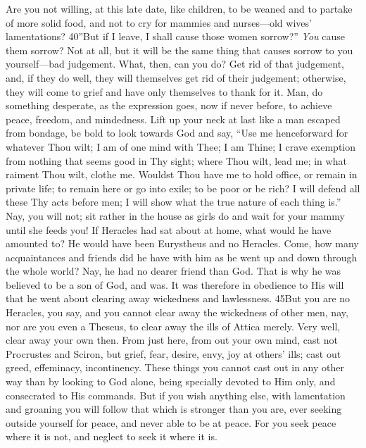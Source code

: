 Are you not willing, at this late date, like children, to be weaned and to partake of more solid food, and not to cry for mammies and nurses—old wives' lamentations? 40''But if I leave, I shall cause those women sorrow?'' \emph{You} cause them sorrow? Not at all, but it will be the same thing that causes sorrow to you yourself—bad judgement. What, then, can you do? Get rid of that judgement, and, if they do well, they will themselves get rid of their judgement; otherwise, they will come to grief and have only themselves to thank for it. Man, do something desperate, as the expression goes, now if never before, to achieve peace, freedom, and mindedness. Lift up your neck at last like a man escaped from bondage, be bold to look towards God and say, ``Use me henceforward for whatever Thou wilt; I am of one mind with Thee; I am Thine; I crave exemption from nothing that seems good in Thy sight; where Thou wilt, lead me; in what raiment Thou wilt, clothe me. Wouldst Thou have me to hold office, or remain in private life; to remain here or go into exile; to be poor or be rich? I will defend all these Thy acts before men; I will show what the true nature of each thing is.'' Nay, you will not; sit rather in the house as girls do and wait for your mammy until she feeds you! If Heracles had sat about at home, what would he have amounted to? He would have been Eurystheus and no Heracles. Come, how many acquaintances and friends did he have with him as he went up and down through the whole world? Nay, he had no dearer friend than God. That is why he was believed to be a son of God, and was. It was therefore in obedience to His will that he went about clearing away wickedness and lawlessness. 45But you are no Heracles, you say, and you cannot clear away the wickedness of other men, nay, nor are you even a Theseus, to clear away the ills of Attica merely. Very well, clear away your own then. From just here, from out your own mind, cast not Procrustes and Sciron, but grief, fear, desire, envy, joy at others' ills; cast out greed, effeminacy, incontinency. These things you cannot cast out in any other way than by looking to God alone, being specially devoted to Him only, and consecrated to His commands. But if you wish anything else, with lamentation and groaning you will follow that which is stronger than you are, ever seeking outside yourself for peace, and never able to be at peace. For you seek peace where it is not, and neglect to seek it where it is.



